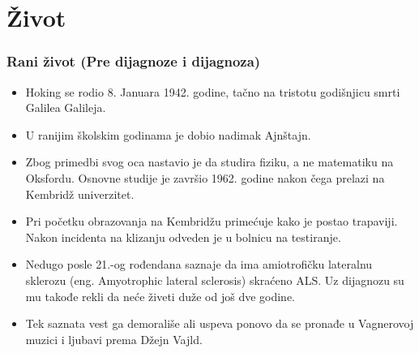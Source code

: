 \documentclass{beamer}
\begin{document}
\section{Život}
\begin{frame}[fragile]\frametitle{Rani život (Pre dijagnoze i dijagnoza)}
\begin{itemize}	 \fontsize{9}{6}\selectfont
		
\item  Hoking se rodio 8. Januara 1942. godine, tačno na tristotu godišnjicu smrti Galilea Galileja.
\item  U ranijim školskim godinama je dobio nadimak Ajnštajn.
\item  Zbog primedbi svog oca nastavio je da studira fiziku, a ne matematiku na Oksfordu. Osnovne studije je završio 1962. godine nakon čega prelazi na Kembridž univerzitet.
\item  Pri početku obrazovanja na Kembridžu primećuje kako je postao trapaviji. Nakon incidenta na klizanju odveden je u bolnicu na testiranje.
\item  Nedugo posle 21.-og rođendana saznaje da ima amiotrofičku lateralnu sklerozu (eng. Amyotrophic lateral 
sclerosis) skraćeno ALS. Uz dijagnozu su mu takođe rekli da neće živeti duže od još dve godine.
\item  Tek saznata vest ga demorališe ali uspeva ponovo da se pronađe u Vagnerovoj muzici i ljubavi prema Džejn Vajld.
\end{itemize}
\end{frame}
\end{document}
